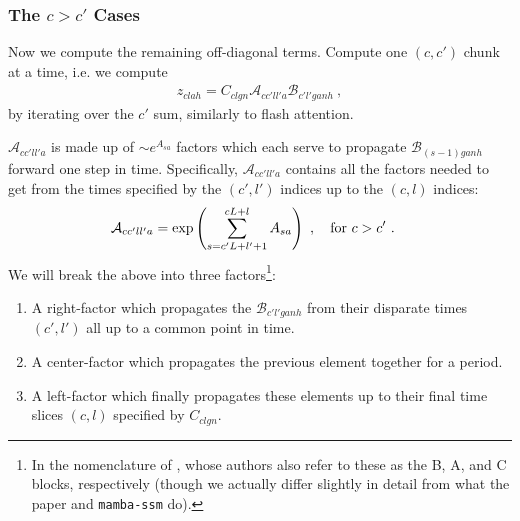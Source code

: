 \documentclass[11pt]{article}
\begin{document}
\subsubsection{The $ c>c'  $ Cases}

Now we compute the remaining off-diagonal terms. Compute one $ (c, c') $ chunk at a time, i.e. we
compute
\begin{align}
    z_{ clah }= C _{ clgn }\mathcal{A}_{ cc'll'a }\mathcal{B}_{ c'l'ganh } \ , \label{app_eq_mamba2_off_diag_chunk}
\end{align}
by iterating over the $ c' $ sum, similarly to flash attention.

$ \mathcal{A}_{ cc'll'a } $ is made up of $\sim  e^{ A_{ sa  } } $ factors which each serve to
propagate $ \mathcal{B }_{ (s-1)ganh } $ forward one step in time. Specifically, $ \mathcal{A}_{
cc'll'a }$ contains all the factors needed to get from the times specified by the $ (c', l') $
indices up to the $ (c, l ) $ indices:
\begin{align}
    \mathcal{A}_{ cc'll'a } &=\exp \left ( \sum_{ s= c'L + l' + 1 }^{ cL + l  }A _{ sa } \right ) \ , \quad {\rm for}\  c>c' \ .
\end{align}
We will break the above into three factors\footnote{In the nomenclature of
\cite{dao2024transformersssmsgeneralizedmodels}, whose authors also refer to these as the B, A, and
C blocks, respectively (though we actually differ slightly in detail from what the paper and
\texttt{mamba-ssm} do).}:
\begin{enumerate}
    \item A right-factor which propagates the $ \mathcal{B}_{ c'l'ganh } $ from their disparate
        times $ (c', l') $ all up to a common point in time.
    \item A center-factor which propagates the previous element together for a period.
    \item A left-factor which finally propagates these elements up to their final time slices $ (c,
        l) $ specified by $ C _{ clgn } $.
\end{enumerate}
\end{document}
